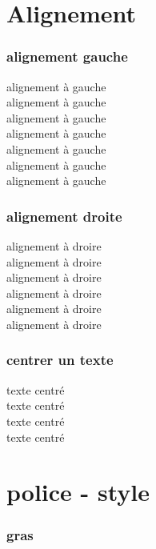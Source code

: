 \documentclass[a4paper,12pt]{book}
\begin{document}
	\part{Alignement}
		\section{alignement gauche}
	\begin{flushleft}
		alignement à gauche \\ 		alignement à gauche \\ 		alignement à gauche \\ 		alignement à gauche \\ 		alignement à gauche \\ 		alignement à gauche \\ 		alignement à gauche \\
	\end{flushleft}
		\section{alignement droite}	
	\begin{flushright}
		alignement à droire \\  		alignement à droire \\ 		alignement à droire \\ 		alignement à droire \\ 		alignement à droire \\ 		alignement à droire \\
	\end{flushright}
		\section{centrer un texte}
	\begin{center}
			texte centré \\ 			texte centré \\ 			texte centré \\ 			texte centré \\
	\end{center}
	
	\part{police - style }
	
	\section{gras}
	
\end{document}
